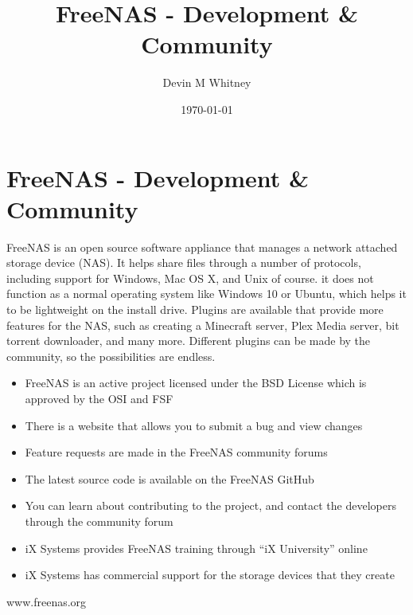 \documentclass[10pt,false,letter]{article}
\providecommand{\tightlist}{\setlength{\itemsep}{0pt}\setlength{\parskip}{0pt}}%
\begin{document}
\title{FreeNAS - Development \& Community}



\author[1]{Devin M Whitney}%
%


\vspace{-1em}



  \date{\today}


\begingroup
\let\center\flushleft
\let\endcenter\endflushleft
\maketitle
\endgroup










\section*{FreeNAS - Development \&
Community}\label{freenas---development-community}

FreeNAS is an open source software appliance that manages a network
attached storage device (NAS). It helps share files through a number of
protocols, including support for Windows, Mac OS X, and Unix of course.
it does not function as a normal operating system like Windows 10 or
Ubuntu, which helps it to be lightweight on the install drive. Plugins
are available that provide more features for the NAS, such as creating a
Minecraft server, Plex Media server, bit torrent downloader, and many
more. Different plugins can be made by the community, so the
possibilities are endless.

\begin{itemize}
\tightlist
\item
  FreeNAS is an active project licensed under the BSD License which is
  approved by the OSI and FSF
\item
  There is a website that allows you to submit a bug and view changes
\item
  Feature requests are made in the FreeNAS community forums
\item
  The latest source code is available on the FreeNAS GitHub
\item
  You can learn about contributing to the project, and contact the
  developers through the community forum
\item
  iX Systems provides FreeNAS training through ``iX University'' online
\item
  iX Systems has commercial support for the storage devices that they
  create
\end{itemize}

www.freenas.org

\clearpage
\end{document}
